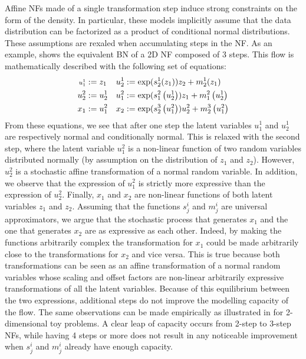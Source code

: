 Affine NFs made of a single transformation step induce strong constraints on the form of the density. In particular, these models implicitly assume that the data distribution can be factorized as a product of conditional normal distributions.
These assumptions are rexaled when accumulating steps in the NF.
As an example,  shows the equivalent BN of a 2D NF composed of 3 steps. This flow is mathematically described with the following set of equations:
\begin{align*}
\vspace{-5em}
\scriptstyle
    u_1^1 &:= z_1  & u_2^1 &:= \exp(s^1_2(z_1))z_2 + m_2^1(z_1) \\
    u_2^2 &:= u_2^1 & u_1^2 &:= \exp(s^2_1\left(u_2^1\right))z_1 + m^2_1\left(u_2^1\right)  \\%
    x_1 &:=  u_1^2 & %
    x_2 &:= \exp(s_2^3\left(u_1^2\right))u^2_2 + m^3_2\left( u_1^2 \right)
\end{align*}
From these equations, we see that after one step the latent variables $u^1_1$ and $u_2^1$ are respectively normal and conditionally normal.
This is relaxed with the second step, where the latent variable $u^2_1$ is a non-linear function of two random variables distributed normally (by assumption on the distribution of $z_1$ and $z_2$).
However, $u_2
^2$ is a stochastic affine transformation of a normal random variable.
In addition, we observe that the expression of $u^2_1$ is strictly more expressive than the expression of $u^2_2$.
Finally, $x_1$ and $x_2$ are non-linear functions of both latent variables $z_1$ and $z_2$.
Assuming that the functions $s^i_j$ and $m^i_j$ are universal approximators, we argue that the stochastic process that generates $x_1$ and the one that generates $x_2$ are as expressive as each other.
Indeed, by making the functions arbitrarily complex the transformation for $x_1$ could be made arbitrarily close to the transformations for $x_2$ and vice versa.
This is true because both transformations can be seen as an affine transformation of a normal random variables whose scaling and offset factors are non-linear arbitrarily expressive transformations of all the latent variables. Because of this equilibrium between the two expressions, additional steps do not improve the modelling capacity of the flow.
The same observations can be made empirically as illustrated in  for 2-dimensional toy problems. A clear leap of capacity occurs from 2-step to 3-step NFs, while having 4 steps or more does not result in any noticeable improvement when $s^i_j$ and $m^i_j$ already have enough capacity.

